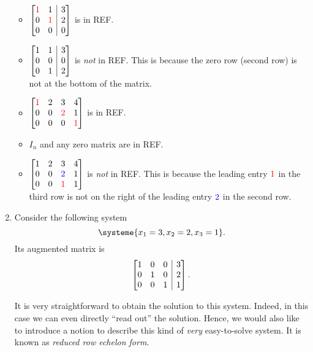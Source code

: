 \begin{enumerate}
\begin{itemize}
\item \(\left[\begin{array}{@{}cc|c@{}}
\rc{1}&1&3\\
0&\rc{1}&2\\
0&0&0\\
\end{array}\right]
\) is in REF.

\item \(\left[\begin{array}{@{}cc|c@{}}
1&1&3\\
0&0&0\\
0&1&2\\
\end{array}\right]
\) is \emph{not} in REF. This is because the zero row (second row) is not at
the bottom of the matrix.

\item \(\mqty[\rc{1}&2&3&4\\ 0&0&\rc{2}&1\\ 0&0&0&\rc{1}]\) is in REF.

\item \(I_n\) and any zero matrix are in REF.

\item \(\mqty[1&2&3&4\\ 0&0&\blc{2}&1\\ 0&0&\rc{1}&1]\) is \emph{not} in REF.
This is because the leading entry \({\color{red}1}\) in the third row is not on the
right of the leading entry \({\color{blue}2}\) in the second row.
\end{itemize}

\item Consider the following system
\[
\systeme{
x_1=3,
x_2=2,
x_3=1
}.
\]
Its augmented matrix is
\[
\left[\begin{array}{@{}ccc|c@{}}
1&0&0&3\\
0&1&0&2\\
0&0&1&1\\
\end{array}\right].
\]

It is very straightforward to obtain the solution to this system. Indeed, in
this case we can even directly ``read out'' the solution. Hence, we would also
like to introduce a notion to describe this kind of \emph{very}
easy-to-solve system. It is known as \emph{reduced row echelon form}.


\end{enumerate}
